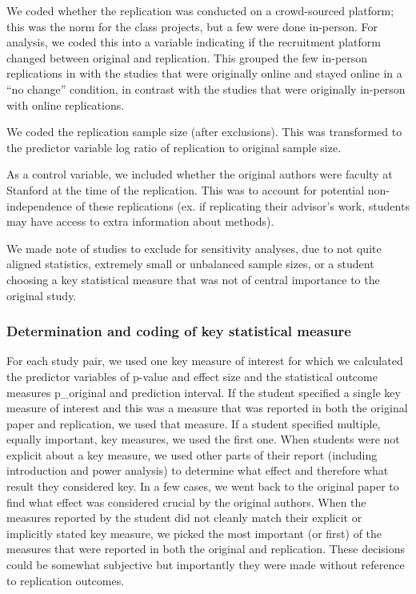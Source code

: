 \documentclass[
  english,
  a4paper,
]{article}
\begin{document}
We coded whether the replication was conducted on a crowd-sourced platform; this was the norm for the class projects, but a few were done in-person. For analysis, we coded this into a variable indicating if the recruitment platform changed between original and replication. This grouped the few in-person replications in with the studies that were originally online and stayed online in a ``no change'' condition, in contrast with the studies that were originally in-person with online replications.

We coded the replication sample size (after exclusions). This was transformed to the predictor variable log ratio of replication to original sample size.

As a control variable, we included whether the original authors were faculty at Stanford at the time of the replication. This was to account for potential non-independence of these replications (ex. if replicating their advisor's work, students may have access to extra information about methods).

We made note of studies to exclude for sensitivity analyses, due to not quite aligned statistics, extremely small or unbalanced sample sizes, or a student choosing a key statistical measure that was not of central importance to the original study.

\hypertarget{determination-and-coding-of-key-statistical-measure}{%
\subsubsection{Determination and coding of key statistical measure}\label{determination-and-coding-of-key-statistical-measure}}

For each study pair, we used one key measure of interest for which we calculated the predictor variables of p-value and effect size and the statistical outcome measures p\_original and prediction interval. If the student specified a single key measure of interest and this was a measure that was reported in both the original paper and replication, we used that measure. If a student specified multiple, equally important, key measures, we used the first one. When students were not explicit about a key measure, we used other parts of their report (including introduction and power analysis) to determine what effect and therefore what result they considered key. In a few cases, we went back to the original paper to find what effect was considered crucial by the original authors. When the measures reported by the student did not cleanly match their explicit or implicitly stated key measure, we picked the most important (or first) of the measures that were reported in both the original and replication. These decisions could be somewhat subjective but importantly they were made without reference to replication outcomes.
\end{document}
